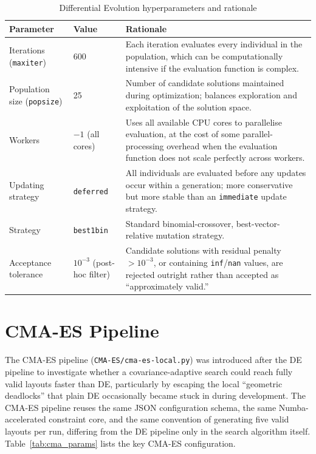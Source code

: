 \documentclass[11pt,a4paper,oneside]{report}
\begin{document}
\begin{table}[H]
\centering
\caption{Differential Evolution hyperparameters and rationale}
\label{tab:de_params}
\begin{tabular}{|p{3.3cm}|p{2.0cm}|p{7.4cm}|}
\hline
\textbf{Parameter} & \textbf{Value} & \textbf{Rationale} \\
\hline
Iterations (\texttt{maxiter}) & 600 & Each iteration evaluates every individual in the population, which can be computationally intensive if the evaluation function is complex. \\ \hline
Population size (\texttt{popsize}) & 25 & Number of candidate solutions maintained during optimization; balances exploration and exploitation of the solution space. \\ \hline
Workers & $-1$ (all cores) & Uses all available CPU cores to parallelise evaluation, at the cost of some parallel-processing overhead when the evaluation function does not scale perfectly across workers. \\ \hline
Updating strategy & \texttt{deferred} & All individuals are evaluated before any updates occur within a generation; more conservative but more stable than an \texttt{immediate} update strategy. \\ \hline
Strategy & \texttt{best1bin} & Standard binomial-crossover, best-vector-relative mutation strategy. \\ \hline
Acceptance tolerance & $10^{-3}$ (post-hoc filter) & Candidate solutions with residual penalty $> 10^{-3}$, or containing \texttt{inf}/\texttt{nan} values, are rejected outright rather than accepted as ``approximately valid.'' \\
\hline
\end{tabular}
\end{table}

\section{CMA-ES Pipeline}
\label{sec:cma_pipeline}
The CMA-ES pipeline (\texttt{CMA-ES/cma-es-local.py}) was introduced after the DE pipeline to investigate whether a covariance-adaptive search could reach fully valid layouts faster than DE, particularly by escaping the local ``geometric deadlocks'' that plain DE occasionally became stuck in during development. The CMA-ES pipeline reuses the same JSON configuration schema, the same Numba-accelerated constraint core, and the same convention of generating five valid layouts per run, differing from the DE pipeline only in the search algorithm itself. Table~\ref{tab:cma_params} lists the key CMA-ES configuration.
\end{document}
